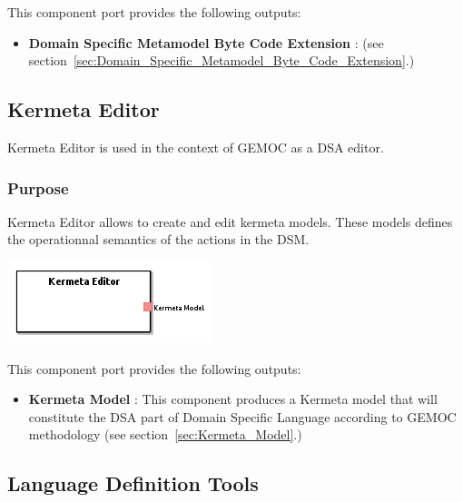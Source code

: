 \documentclass{gemoc} %
\begin{document}
This component port provides the following outputs:
\begin{itemize}
  \item \textbf{Domain Specific Metamodel Byte Code Extension} :
(see section~\ref{sec:Domain_Specific_Metamodel_Byte_Code_Extension}.)
\end{itemize}


\subsection{Kermeta Editor}
\label{sec:Kermeta_Editor}
Kermeta Editor is used in the context of GEMOC as a DSA editor.

\subsubsection{Purpose}
Kermeta Editor allows to create and edit kermeta models. These models defines the operationnal semantics of the actions in the DSM.

\begin{center}
\includegraphics*[trim=0.0cm 0.0cm 0cm 0.0cm, clip=true]{../images/generated/Generated_Kermeta_Editor.png}
\end{center}


This component port provides the following outputs:
\begin{itemize}
  \item \textbf{Kermeta Model} :
This component produces a Kermeta model that will constitute the DSA part of Domain Specific Language according to GEMOC methodology 
(see section~\ref{sec:Kermeta_Model}.)
\end{itemize}


\subsection{Language Definition Tools}
\label{sec:Language_Definition_Tools}
\end{document}
